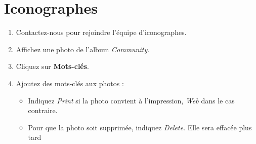 \documentclass[12pt,nofoldmark,notumble]{leaflet}
\begin{document}
\clearpage

\section{\faTag Iconographes}

\vspace*{\fill}

\begin{enumerate}[itemsep=0mm,leftmargin=*]

\item Contactez-nous pour rejoindre l'équipe d'iconographes.
\item Affichez une photo de l'album \emph{Community}.
\item Cliquez sur \faPencil \textbf{Mots-clés}.
\item Ajoutez des mots-clés aux photos :

  \begin{itemize}
  \item Indiquez \emph{Print} si la photo convient à l'impression, \emph{Web}
    dans le cas contraire.

  \item Pour que la photo soit supprimée, indiquez \emph{Delete}.  Elle sera
    effacée plus tard

  \end{itemize}
\end{enumerate}
  
\begin{center}
  \setlength{\fboxsep}{0pt}%
  \setlength{\fboxrule}{0pt}%
\end{center}
\end{document}
